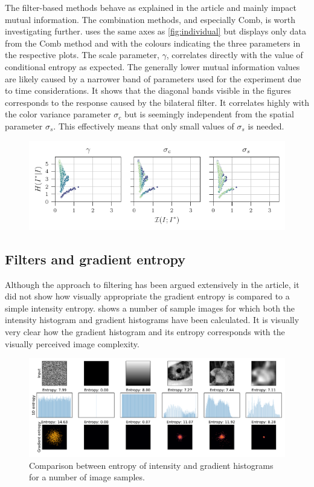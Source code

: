 The filter-based methods behave as explained in the article and mainly impact mutual information. The combination methods, and especially Comb, is worth investigating further.  uses the same axes as \cref{fig:individual} but displays only data from the Comb method and with the colours indicating the three parameters in the respective plots. The scale parameter, $\gamma$, correlates directly with the value of conditional entropy as expected. The generally lower mutual information values are likely caused by a narrower band of parameters used for the experiment due to time considerations. It shows that the diagonal bands visible in the figures corresponds to the response caused by the bilateral filter. It correlates highly with the color variance parameter $\sigma_c$ but is seemingly independent from the spatial parameter $\sigma_s$. This effectively means that only small values of $\sigma_s$ is needed.

\begin{figure}
	\centering
	\includegraphics[width=1\textwidth]{figures/results/comb}
	\caption{}\label{fig:comb}
\end{figure}

\subsection{Filters and gradient entropy}
Although the approach to filtering has been argued extensively in the article, it did not show how visually appropriate the gradient entropy is compared to a simple intensity entropy.  shows a number of sample images for which both the intensity histogram and gradient histograms have been calculated. It is visually very clear how the gradient histogram and its entropy corresponds with the visually perceived image complexity.

\begin{figure}
    \centering
    \includegraphics[width=1\linewidth]{figures/results/delentropy}
    \caption{Comparison between entropy of intensity and gradient histograms for a number of image samples.}
    \label{fig:delentropy}
\end{figure}

